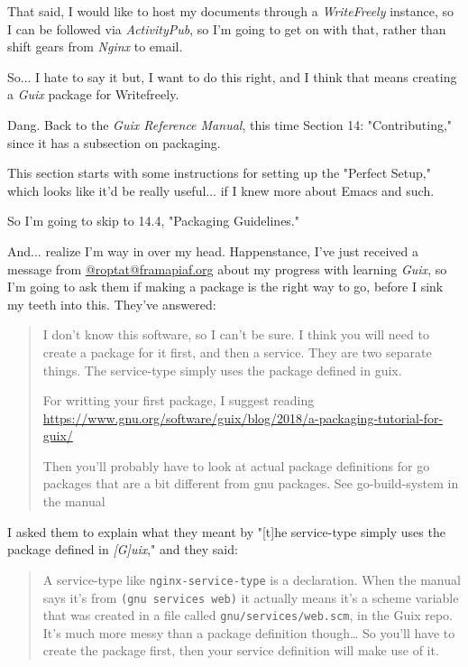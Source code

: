 \documentclass[11pt]{article}
\begin{document}
That said, I would like to host my documents through a \emph{WriteFreely}
instance, so I can be followed via \emph{ActivityPub}, so I'm going to get on
with that, rather than shift gears from \emph{Nginx} to email.

So... I hate to say it but, I want to do this right, and I think that
means creating a \emph{Guix} package for Writefreely.

Dang. Back to the \emph{Guix Reference Manual}, this time Section 14:
"Contributing," since it has a subsection on packaging.

This section starts with some instructions for setting up the "Perfect
Setup," which looks like it'd be really useful... if I knew more about
Emacs and such.

So I'm going to skip to 14.4, "Packaging Guidelines."

And... realize I'm way in over my head. Happenstance, I've just
received a message from \href{https://framapiaf.org/@roptat}{@roptat@framapiaf.org} about my progress with
learning \emph{Guix}, so I'm going to ask them if making a package is the
right way to go, before I sink my teeth into this. They've answered:

\begin{quote}
I don't know this software, so I can't be sure. I think you will need
to create a package for it first, and then a service. They are two
separate things. The service-type simply uses the package defined in
guix.

For writting your first package, I suggest reading
\url{https://www.gnu.org/software/guix/blog/2018/a-packaging-tutorial-for-guix/}

Then you'll probably have to look at actual package definitions for go
packages that are a bit different from gnu packages. See
go-build-system in the manual
\end{quote}

I asked them to explain what they meant by "[t]he service-type simply
uses the package defined in \emph{[G]uix}," and they said:

\begin{quote}
A service-type like \texttt{nginx-service-type} is a declaration. When the
manual says it's from \texttt{(gnu services web)} it actually means it's a
scheme variable that was created in a file called
\texttt{gnu/services/web.scm}, in the Guix repo. It's much more messy than a
package definition though… So you'll have to create the package first,
then your service definition will make use of it.
\end{quote}
\end{document}

